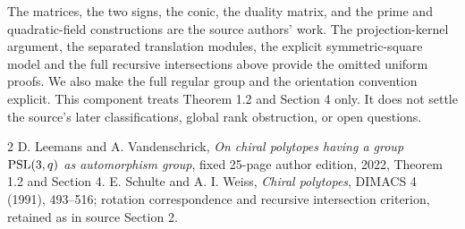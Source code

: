 \documentclass[11pt,a4paper]{article}
\begin{document}
The matrices, the two signs, the conic, the duality matrix, and the
prime and quadratic-field constructions are the source authors' work.
The projection-kernel argument, the separated translation modules, the
explicit symmetric-square model and the full recursive intersections
above provide the omitted uniform proofs. We also make the full regular
group and the orientation convention explicit. This component treats
Theorem 1.2 and Section 4 only. It does not settle the source's later
classifications, global rank obstruction, or open questions.

\begin{thebibliography}{2}
 D. Leemans and A. Vandenschrick,
\emph{On chiral polytopes having a group $\operatorname{PSL}(3,q)$ as automorphism
group}, fixed 25-page author edition, 2022, Theorem 1.2 and Section 4.
 E. Schulte and A. I. Weiss, \emph{Chiral polytopes},
DIMACS 4 (1991), 493--516; rotation correspondence and recursive
intersection criterion, retained as in source Section 2.
\end{thebibliography}
\end{document}
